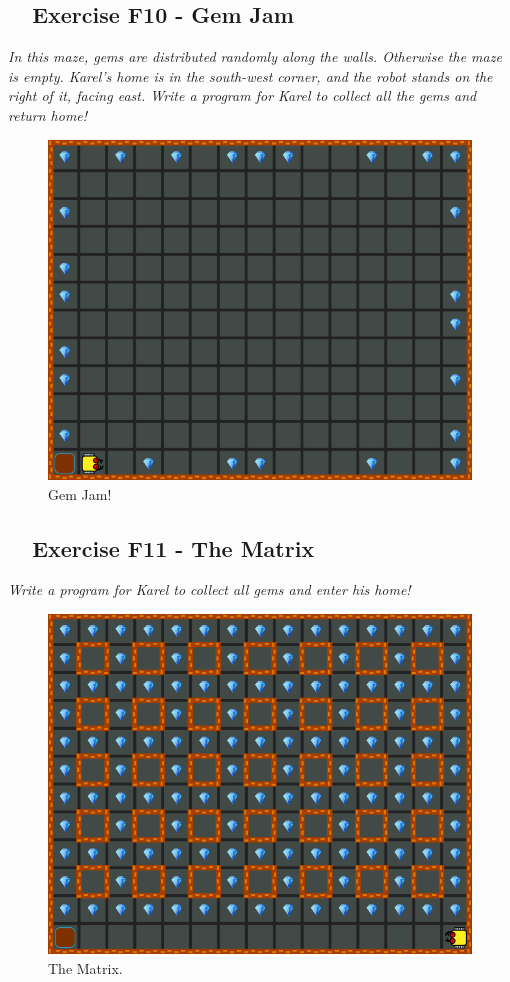 {{{{\subsection{\ \ Exercise F10 - Gem Jam}

{\em In this maze, gems are distributed randomly along the walls. Otherwise 
the maze is empty. Karel's home is in the south-west corner, and the robot 
stands on the right of it, facing east. Write a program for Karel to collect 
all the gems and return home!}\\[-7mm]

\begin{figure}[!ht]
\begin{center}
\includegraphics[height=0.4\textwidth]{imgk/f10.png}
\end{center}
\vspace{-4mm}
\caption{Gem Jam!}
\label{fig:f10}
\vspace{-10mm}
\end{figure}
\noindent

\newpage

\subsection{\ \ Exercise F11 - The Matrix}

{\em Write a program for Karel to collect all gems and enter his home!}\\[-7mm]

\begin{figure}[!ht]
\begin{center}
\includegraphics[height=0.4\textwidth]{imgk/f11.png}
\end{center}
\vspace{-4mm}
\caption{The Matrix.}
\label{fig:f11}
\vspace{-10mm}
\end{figure}
\noindent

}}}}
